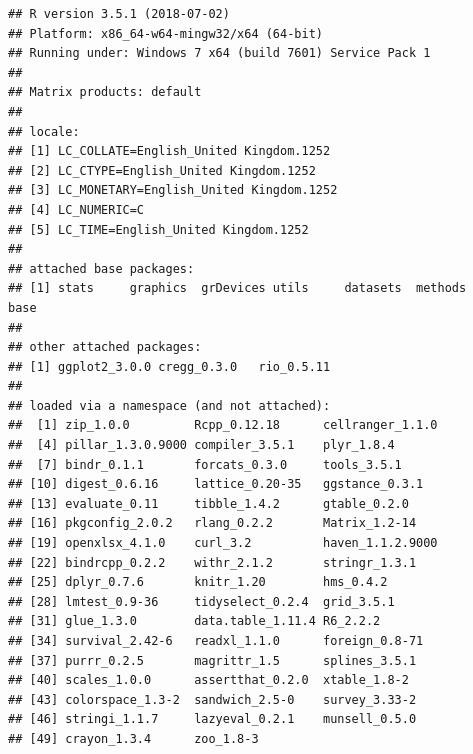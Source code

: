 \documentclass[a4paper,12pt]{article}\usepackage[]{graphicx}\usepackage[]{color}
\makeatletter
\newenvironment{kframe}{%
 \def\at@end@of@kframe{}%
 \ifinner\ifhmode%
  \def\at@end@of@kframe{\end{minipage}}%
  \begin{minipage}{\columnwidth}%
 \fi\fi%
 \def\FrameCommand##1{\hskip\@totalleftmargin \hskip-\fboxsep
 \colorbox{shadecolor}{##1}\hskip-\fboxsep
     \hskip-\linewidth \hskip-\@totalleftmargin \hskip\columnwidth}%
 \MakeFramed {\advance\hsize-\width
   \@totalleftmargin\z@ \linewidth\hsize
   \@setminipage}}%
 {\par\unskip\endMakeFramed%
 \at@end@of@kframe}
\newenvironment{knitrout}{}{} %
\makeatother
\begin{document}
\begin{knitrout}
\color{fgcolor}\begin{kframe}
\begin{verbatim}
## R version 3.5.1 (2018-07-02)
## Platform: x86_64-w64-mingw32/x64 (64-bit)
## Running under: Windows 7 x64 (build 7601) Service Pack 1
## 
## Matrix products: default
## 
## locale:
## [1] LC_COLLATE=English_United Kingdom.1252 
## [2] LC_CTYPE=English_United Kingdom.1252   
## [3] LC_MONETARY=English_United Kingdom.1252
## [4] LC_NUMERIC=C                           
## [5] LC_TIME=English_United Kingdom.1252    
## 
## attached base packages:
## [1] stats     graphics  grDevices utils     datasets  methods   base     
## 
## other attached packages:
## [1] ggplot2_3.0.0 cregg_0.3.0   rio_0.5.11   
## 
## loaded via a namespace (and not attached):
##  [1] zip_1.0.0         Rcpp_0.12.18      cellranger_1.1.0 
##  [4] pillar_1.3.0.9000 compiler_3.5.1    plyr_1.8.4       
##  [7] bindr_0.1.1       forcats_0.3.0     tools_3.5.1      
## [10] digest_0.6.16     lattice_0.20-35   ggstance_0.3.1   
## [13] evaluate_0.11     tibble_1.4.2      gtable_0.2.0     
## [16] pkgconfig_2.0.2   rlang_0.2.2       Matrix_1.2-14    
## [19] openxlsx_4.1.0    curl_3.2          haven_1.1.2.9000 
## [22] bindrcpp_0.2.2    withr_2.1.2       stringr_1.3.1    
## [25] dplyr_0.7.6       knitr_1.20        hms_0.4.2        
## [28] lmtest_0.9-36     tidyselect_0.2.4  grid_3.5.1       
## [31] glue_1.3.0        data.table_1.11.4 R6_2.2.2         
## [34] survival_2.42-6   readxl_1.1.0      foreign_0.8-71   
## [37] purrr_0.2.5       magrittr_1.5      splines_3.5.1    
## [40] scales_1.0.0      assertthat_0.2.0  xtable_1.8-2     
## [43] colorspace_1.3-2  sandwich_2.5-0    survey_3.33-2    
## [46] stringi_1.1.7     lazyeval_0.2.1    munsell_0.5.0    
## [49] crayon_1.3.4      zoo_1.8-3
\end{verbatim}
\end{kframe}
\end{knitrout}
\end{document}
